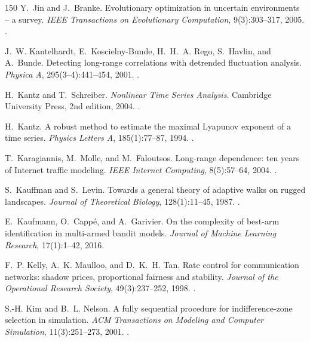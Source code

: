 \begin{thebibliography}{150}
Y.~Jin and J.~Branke. Evolutionary optimization in uncertain environments -- a survey. \emph{IEEE Transactions on Evolutionary Computation}, 9(3):303--317, 2005. .

J.~W. Kantelhardt, E.~Koscielny-Bunde, H.~H.~A. Rego, S.~Havlin, and A.~Bunde. Detecting long-range correlations with detrended fluctuation analysis. \emph{Physica A}, 295(3--4):441--454, 2001. .

H.~Kantz and T.~Schreiber. \emph{Nonlinear Time Series Analysis}. Cambridge University Press, 2nd edition, 2004. .

H.~Kantz. A robust method to estimate the maximal Lyapunov exponent of a time series. \emph{Physics Letters A}, 185(1):77--87, 1994. .

T.~Karagiannis, M.~Molle, and M.~Faloutsos. Long-range dependence: ten years of Internet traffic modeling. \emph{IEEE Internet Computing}, 8(5):57--64, 2004. .

S.~Kauffman and S.~Levin. Towards a general theory of adaptive walks on rugged landscapes. \emph{Journal of Theoretical Biology}, 128(1):11--45, 1987. .

E.~Kaufmann, O.~Capp{\'e}, and A.~Garivier. On the complexity of best-arm identification in multi-armed bandit models. \emph{Journal of Machine Learning Research}, 17(1):1--42, 2016.

F.~P. Kelly, A.~K. Maulloo, and D.~K.~H. Tan. Rate control for communication networks: shadow prices, proportional fairness and stability. \emph{Journal of the Operational Research Society}, 49(3):237--252, 1998. .

S.-H. Kim and B.~L. Nelson. A fully sequential procedure for indifference-zone selection in simulation. \emph{ACM Transactions on Modeling and Computer Simulation}, 11(3):251--273, 2001. .


\end{thebibliography}
